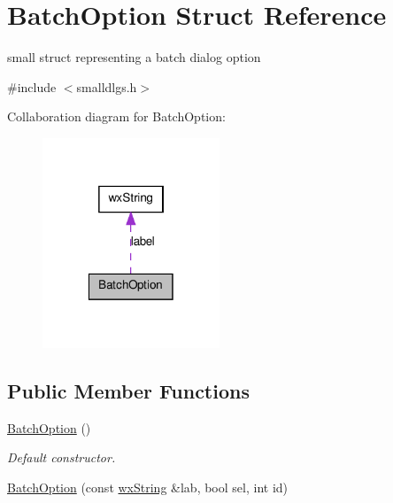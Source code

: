 \hypertarget{structBatchOption}{
\section{BatchOption Struct Reference}
\label{structBatchOption}
}


small struct representing a batch dialog option  




{\ttfamily \#include $<$smalldlgs.h$>$}



Collaboration diagram for BatchOption:
\nopagebreak
\begin{figure}[H]
\begin{center}
\leavevmode
\includegraphics[width=150pt]{structBatchOption__coll__graph}
\end{center}
\end{figure}
\subsection*{Public Member Functions}
\begin{DoxyCompactItemize}
\item 
\hypertarget{structBatchOption_aa639871692215e775a06995c4fe1b108}{
\hyperlink{structBatchOption_aa639871692215e775a06995c4fe1b108}{BatchOption} ()}
\label{structBatchOption_aa639871692215e775a06995c4fe1b108}

\begin{DoxyCompactList}\small\item\em Default constructor. \item\end{DoxyCompactList}\item 
\hyperlink{structBatchOption_af1c023f85fa9f2faac1fe8898ad9895f}{BatchOption} (const \hyperlink{classwxString}{wxString} \&lab, bool sel, int id)
\end{DoxyCompactItemize}
